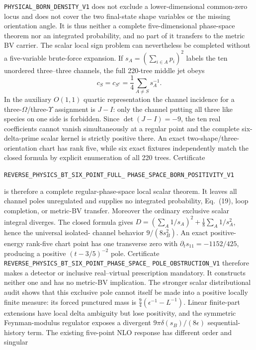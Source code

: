 \documentclass[11pt]{article}
\theoremstyle{definition}
\theoremstyle{remark}
\begin{document}
\allowbreak\texttt{PHYSICAL\_BORN\_DENSITY\_V1}
does not exclude a lower-dimensional common-zero locus and does not cover the
two final-state shape variables or the missing orientation angle.  It is thus
neither a complete five-dimensional phase-space theorem nor an integrated
probability, and no part of it transfers to the metric BV carrier.
The scalar local sign problem can nevertheless be completed without a
five-variable brute-force expansion.  If $s_A=(\sum_{i\in A}p_i)^2$ labels the
ten unordered three--three channels, the full 220-tree middle jet obeys
\[
 c_S=c_{S^c}=\frac14\sum_{A\ne S}s_A^{-1}.
\]
In the auxiliary $O(1,1)$ quartic representation the channel incidence for a
three-$\Omega$/three-$\Upsilon$ assignment is $J-I$: only the channel putting
all three like species on one side is forbidden.  Since $\det(J-I)=-9$, the
ten real coefficients cannot vanish simultaneously at a regular point and
the complete six-delta-prime scalar kernel is strictly positive there.  An
exact two-shape/three-orientation chart has rank five, while six exact fixtures
independently match the closed formula by explicit enumeration of all 220
trees.  Certificate
\par\noindent
\texttt{REVERSE\_PHYSICS\_BT\_SIX\_POINT\_FULL\_}
\allowbreak\texttt{PHASE\_SPACE\_BORN\_POSITIVITY\_V1}
\par\noindent
is therefore a complete regular-phase-space local scalar theorem.  It leaves
all channel poles unregulated and supplies no integrated probability, Eq.~(19),
loop completion, or metric-BV transfer.
Moreover the ordinary exclusive scalar integral diverges.  The closed formula
gives $D=(\sum_A1/s_A)^2+\frac18\sum_A1/s_A^2$, hence the universal isolated-
channel behavior $9/(8s_B^2)$.  An exact positive-energy rank-five chart point
has one transverse zero with $\partial_ts_{11}=-1152/425$, producing a positive
$(t-3/5)^{-2}$ pole.  Certificate
\texttt{REVERSE\_PHYSICS\_BT\_SIX\_POINT\_PHASE\_SPACE\_}
\allowbreak\texttt{POLE\_OBSTRUCTION\_V1}
therefore makes a detector or inclusive real--virtual prescription mandatory.
It constructs neither one and has no metric-BV implication.
The stronger scalar distributional audit shows that this exclusive pole cannot
itself be made into a positive locally finite measure: its forced punctured
mass is $\frac94(\epsilon^{-1}-L^{-1})$.  Linear finite-part extensions have
local delta ambiguity but lose positivity, and the symmetric Feynman-modulus
regulator exposes a divergent $9\pi\delta(s_B)/(8\epsilon)$ sequential-history
term.  The existing five-point NLO response has different order and singular
\end{document}
